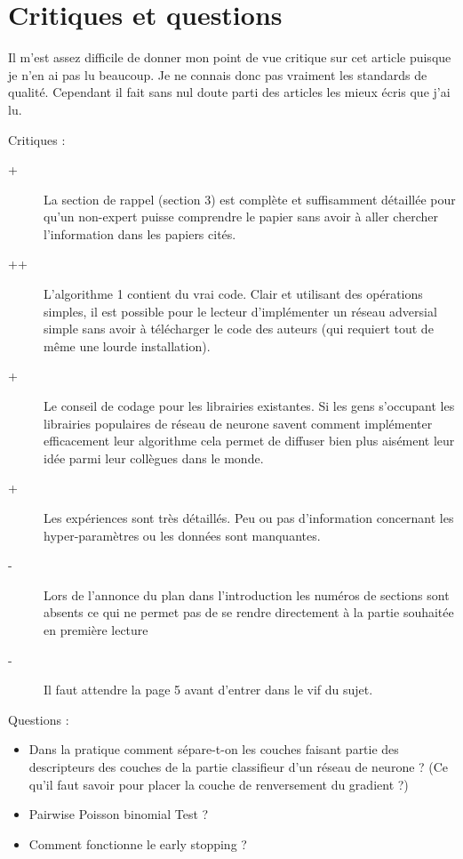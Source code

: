\documentclass[accepted]{article} %
\begin{document}
\section{Critiques et questions} %
\label{sec:critiques_et_questions}

Il m'est assez difficile de donner mon point de vue critique sur cet article
puisque je n'en ai pas lu beaucoup. Je ne connais donc pas vraiment les 
standards de qualité. Cependant il fait sans nul doute parti des articles les 
mieux écris que j'ai lu.

Critiques :
\begin{description}
	\item[+] La section de rappel (section 3) est complète et suffisamment 
	détaillée pour qu'un non-expert puisse comprendre le papier sans avoir
	à aller chercher l'information dans les papiers cités.
	\item[++] L'algorithme 1 contient du vrai code. Clair et utilisant des 
	opérations simples, il est possible pour le lecteur d'implémenter un 
	réseau adversial simple sans avoir à télécharger le code des auteurs
	(qui requiert tout de même une lourde installation).
	\item[+] Le conseil de codage pour les librairies existantes. Si les gens
	s'occupant les librairies populaires de réseau de neurone savent comment 
	implémenter efficacement leur algorithme cela permet de	diffuser bien plus
	aisément leur idée parmi leur collègues dans le monde.
	\item[+] Les expériences sont très détaillés. Peu ou pas d'information 
	concernant les hyper-paramètres ou les données sont manquantes.
	\item[-] Lors de l'annonce du plan dans l'introduction les numéros de 
	sections sont absents ce qui ne permet pas de se rendre directement à 
	la partie souhaitée en première lecture
	\item[-] Il faut attendre la page 5 avant d'entrer dans le vif du sujet.
\end{description}

Questions :
\begin{itemize}
	\item Dans la pratique comment sépare-t-on les couches faisant partie des
	descripteurs des couches de la partie classifieur d'un réseau de neurone ?
	(Ce qu'il faut savoir pour placer la couche de renversement du gradient ?)
	\item Pairwise Poisson binomial Test ?
	\item Comment fonctionne le early stopping ?
\end{itemize}
\end{document}

